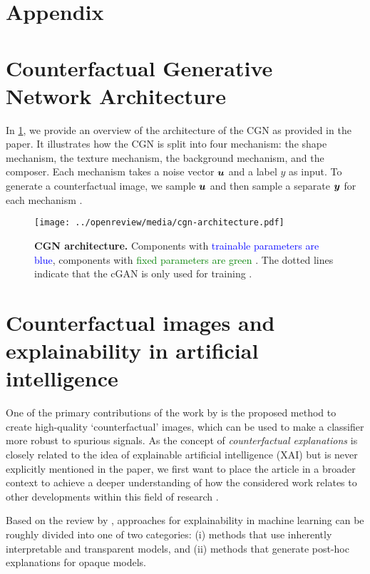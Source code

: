 \newpage

\appendix
\section*{Appendix}


\section{Counterfactual Generative Network Architecture} \label{sec:cgn-architecture}
In \cref{fig:cgn-architecture}, we provide an overview of the architecture of the CGN as provided in the paper. It illustrates how the CGN is split into four mechanism: the shape mechanism, the texture mechanism, the background mechanism, and the composer. Each mechanism takes a noise vector $\boldsymbol{u}$ and a label $y$ as input. To generate a counterfactual image, we sample $\boldsymbol{u}$ and then sample a separate $\boldsymbol{y}$ for each mechanism .

\begin{figure}[H]
    \centering
    \texttt{[image: ../openreview/media/cgn-architecture.pdf]}
    \caption{\textbf{CGN architecture.} Components with \textcolor{Blue}{trainable parameters are blue}, components with \textcolor{Green}{fixed parameters are green} \cite{Sauer2021ICLR}. The dotted lines indicate that the cGAN is only used for training \cite{Sauer2021ICLR}.}
    \label{fig:cgn-architecture}
\end{figure}


\section{Counterfactual images and explainability in artificial intelligence} \label{sec:counterfactuals}
One of the primary contributions of the work by  is the proposed method to create high-quality `counterfactual' images, which can be used to make a classifier more robust to spurious signals. As the concept of \emph{counterfactual explanations} is closely related to the idea of explainable artificial intelligence (XAI) but is never explicitly mentioned in the paper, we first want to place the article in a broader context to achieve a deeper understanding of how the considered work relates to other developments within this field of research \cite{arrieta2020explainable}.

Based on the review by , approaches for explainability in machine learning can be roughly divided into one of two categories:
(i) methods that use inherently interpretable and transparent models, and (ii) methods that generate post-hoc explanations for opaque models.

